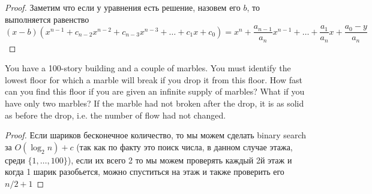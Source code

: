 \begin{proof}
Заметим что если у уравнения есть решение, назовем его $b$, то выполняется равенство
$$
(x - b)(x^{n-1} + c_{n-2} x^{n-2} + c_{n-3} x^{n-3} + \ldots + c_1 x + c_0) = x^n + \frac{a_{n-1}}{a_n} x^{n-1} + \ldots + \frac{a_1}{a_n} x + \frac{a_{0} - y}{a_n}
$$


\end{proof}
\vskip 0.6in



\begin{prob}
You have a 100-story building and a couple of marbles. You must identify the lowest floor for which a marble will break if you drop it from this floor. How fast can you find this floor if you are given an infinite supply of marbles? What if you have only two marbles? If the marble had not broken after the drop, it is as solid as before the drop, i.e. the number of flow had not changed.
\end{prob}

\begin{proof}
Если шариков бесконечное количество, то мы можем сделать binary search за $O(\log_2 n) + c$ (так как по факту это поиск числа, в данном случае этажа, среди $\{1, \ldots, 100\}$), если их всего 2 то мы можем проверять каждый 2й этаж и когда 1 шарик разобьется, можно спуститься на этаж и также проверить его $n/2 + 1$
\end{proof}
